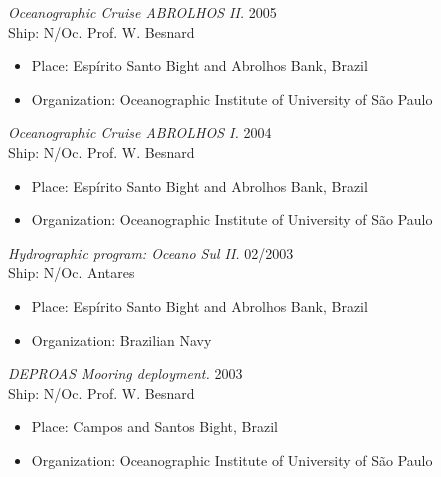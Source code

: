 \documentclass[line,margin]{res}
\begin{document}
\begin{resume}
{\sl Oceanographic Cruise ABROLHOS II.} \hfill 2005\\
Ship: N/Oc. Prof. W. Besnard
\begin{itemize}  \itemsep -2pt
  \item Place: Espírito Santo Bight and Abrolhos Bank, Brazil
  \item Organization: Oceanographic Institute of University of São Paulo
\end{itemize}

{\sl Oceanographic Cruise ABROLHOS I.} \hfill 2004\\
Ship: N/Oc. Prof. W. Besnard
\begin{itemize}  \itemsep -2pt
  \item Place: Espírito Santo Bight and Abrolhos Bank, Brazil
  \item Organization: Oceanographic Institute of University of São Paulo
\end{itemize}

{\sl Hydrographic program: Oceano Sul II.} \hfill 02/2003\\
Ship: N/Oc. Antares
\begin{itemize}  \itemsep -2pt
  \item Place: Espírito Santo Bight and Abrolhos Bank, Brazil
  \item Organization: Brazilian Navy
\end{itemize}

{\sl DEPROAS Mooring deployment.} \hfill 2003\\
Ship: N/Oc. Prof. W. Besnard
\begin{itemize}  \itemsep -2pt
  \item Place: Campos and Santos Bight, Brazil
  \item Organization: Oceanographic Institute of University of São Paulo
\end{itemize}

\end{resume}
\end{document}
